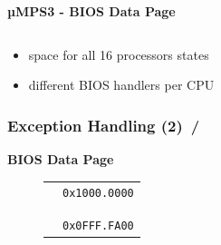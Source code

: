 \documentclass{beamer}
\begin{document}
\begin{frame}
\begin{center}
\begin{minipage}{0.47\textwidth}
\begin{block}{\textbf{{\small µMPS3 - BIOS Data Page}}}
\begin{figure}[h]
\begin{tabular}{rcl}
					\end{tabular}
				\end{figure}
				\begin{scriptsize}
					\begin{itemize}
						\item space for all 16 processors states
						\item different BIOS handlers per CPU
					\end{itemize}
				\end{scriptsize}
			\end{block}
		\end{minipage}
	\end{center}
\end{frame}

\begin{frame}
	\frametitle{Exception Handling (2) \hspace{0pt plus 1 filll} \insertframenumber\,/\,\inserttotalframenumber}
	\begin{center}
		\begin{minipage}{0.49\textwidth}
			\begin{block}{\textbf{BIOS Data Page}}
				\begin{figure}[h]
					\renewcommand{\arraystretch}{0.91}
					\begin{tabular}{cl}
						\multicolumn{1}{l}{}                                                                                          & \multirow{2}{*}{\texttt{{\tiny 0x1000.0000}}} \\ \hhline{-~}
						\multicolumn{1}{|l|}{\multirow{4}{*}{\cellcolor{nord0}}}                                                      &                                               \\
						\multicolumn{1}{|l|}{\cellcolor{nord0}}                                                                       &                                               \\
						\multicolumn{1}{|l|}{\cellcolor{nord0}}                                                                       &                                               \\
						\multicolumn{1}{|l|}{\cellcolor{nord0}}                                                                       & \multirow{2}{*}{\texttt{{\tiny 0x0FFF.FA00}}} \\ \hhline{-~}
						\multicolumn{1}{|c|}{\cellcolor{nord10}}                                                                      &                                               \\

\end{tabular}
\end{figure}
\end{block}
\end{minipage}
\end{center}
\end{frame}
\end{document}
